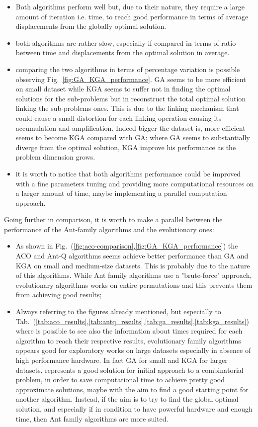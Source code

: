 \documentclass[10pt]{article}
\begin{document}
\begin{itemize}
\item Both algorithms perform well but, due to their nature, they require a large amount of iteration i.e. time, to reach good performance in terms of average displacements from the globally optimal solution.
\item both algorithms are rather slow, especially if compared in terms of ratio between time and displacements from the optimal solution in average.
\item comparing the two algorithms in terms of percentage variation is possible observing Fig.~\ref{fig:GA_KGA_performance}. GA seems to be more efficient on small dataset while KGA seems to suffer not in finding the optimal solutions for the sub-problems but in reconstruct the total optimal solution linking the sub-problems ones. This is due to the linking mechanism that could cause a small distortion for each linking operation causing its accumulation and amplification. Indeed bigger the dataset is, more efficient seems to become KGA compared with GA; where GA seems to substantially diverge from the optimal solution, KGA improve his performance as the problem dimension grows.
\item it is worth to notice that both algorithms performance could be improved with a fine parameters tuning and providing more computational resources on a larger amount of time, maybe implementing a parallel computation approach. 
\end{itemize}
Going further in comparison, it is worth to make a parallel between the performance of the Ant-family algorithms and the evolutionary ones:
\begin{itemize}
\item As shown in Fig.~(\ref{fig:aco-comparison},\ref{fig:GA_KGA_performance}) the ACO and Ant-Q algorithms seems achieve better performance than GA and KGA on small and medium-size datasets. 
This is probably due to the nature of this algorithms.
While Ant family algorithms use a "brute-force" approach, evolutionary algorithms works on entire permutations and this prevents them from achieving good results;
\item Always referring to the figures already mentioned, but especially to Tab.~(\ref{tab:aco_results},\ref{tab:antq_results},\ref{tab:ga_results},\ref{tab:kga_results}) where is possible to see also the information about times required for each algorithm to reach their respective results, evolutionary family algorithms appears good for exploratory works on large datasets especially in absence of high performance hardware.
In fact GA for small and KGA for larger datasets, represents a good solution for initial approach to a combinatorial problem, in order to save computational time to achieve pretty good approximate solutions, maybe with the aim to find a good starting point for another algorithm.
Instead, if the aim is to try to find the global optimal solution, and especially if in condition to have powerful hardware and enough time, then Ant family algorithms are more suited.
\end{itemize}
\end{document}
